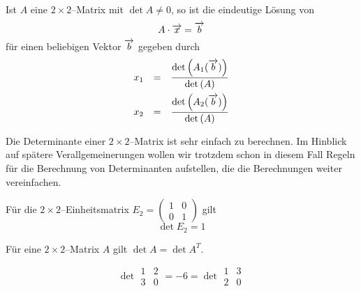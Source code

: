 \begin{satz}\label{cramer_regel_2_1} Ist $A$ eine $2 \times 2$--Matrix mit $\det{A} \neq 0$, so ist 
die eindeutige Lösung von 
  	$$ A  \cdot \overrightarrow{x} = \overrightarrow{b} $$
für einen beliebigen Vektor $ \overrightarrow{b}$ gegeben durch 
  	$$ \begin{array} {l c l}
   	x_1 & = & \dfrac {\det{A_1(\vektor{b})}}{\det{A}} \\[1.0em]
   	x_2 & = & \dfrac {\det{A_2(\vektor{b})}}{\det{A}}
  	\end{array} $$
\end{satz}

\bigbreak 

Die Determinante einer $2 \times 2$--Matrix ist sehr einfach zu berechnen. Im Hinblick auf spätere 
Verallgemeinerungen wollen wir trotzdem schon in diesem Fall Regeln für die Berechnung von Determinanten 
aufstellen, die die Berechnungen weiter vereinfachen.

\begin{regel}\label{det_norm_2} Für die $2 \times 2$--Einheitsmatrix
$E_2 = \left( \begin{smallmatrix} 1 & 0 \\ 0 & 1 \end{smallmatrix} \right)$ gilt
  	$$ \det{E_2} = 1 $$
\end{regel}

\medbreak

\begin{regel}\label{det_transpon_2} Für eine $2 \times 2$--Matrix $A$ gilt $\det{A} = \det{A^T}$.
\end{regel}


\begin{beispiel}
  	$$ \det{ \begin{matrix} 1 & 2 \\ 3 & 0 \end{matrix} } = -6 = 
   	\det{ \begin{matrix} 1 & 3 \\ 2 & 0 \end{matrix} } $$
\end{beispiel} 

